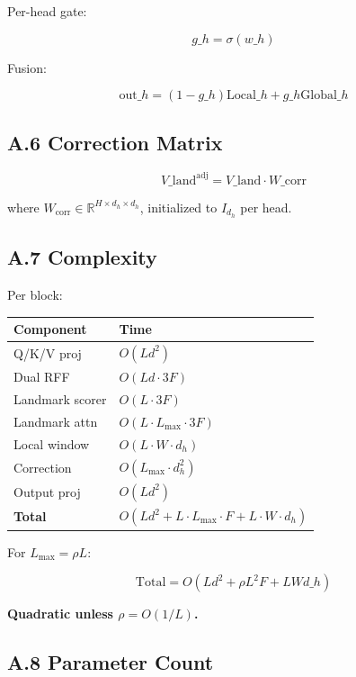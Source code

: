 Per-head gate:

\[
g\_h = \sigma(w\_h)
\tag{A.11}
\]

Fusion:

\[
\text{out}\_h = (1 - g\_h) \text{Local}\_h + g\_h \text{Global}\_h
\tag{A.12}
\]

\subsection{A.6 Correction Matrix}

\[
V\_\text{land}^\text{adj} = V\_\text{land} \cdot W\_\text{corr}
\tag{A.13}
\]

where $W_\text{corr} \in \mathbb{R}^{H \times d_h \times d_h}$, initialized 
to $I_{d_h}$ per head.

\subsection{A.7 Complexity}

Per block:

\begin{table}[H]
\centering
\small
\begin{tabular}{ll}
\toprule
\textbf{Component} & \textbf{Time} \\
\midrule
Q/K/V proj & $O(L d^2)$ \\
Dual RFF & $O(L d \cdot 3F)$ \\
Landmark scorer & $O(L \cdot 3F)$ \\
Landmark attn & $O(L \cdot L_\text{max} \cdot 3F)$ \\
Local window & $O(L \cdot W \cdot d_h)$ \\
Correction & $O(L_\text{max} \cdot d_h^2)$ \\
Output proj & $O(L d^2)$ \\
\textbf{Total} & $O(L d^2 + L \cdot L_\text{max} \cdot F + L \cdot W \cdot d_h)$ \\
\bottomrule
\end{tabular}
\end{table}

For $L_\text{max} = \rho L$:

\[
\text{Total} = O(L d^2 + \rho L^2 F + L W d\_h)
\]

\textbf{Quadratic unless $\rho = O(1/L)$.}

\subsection{A.8 Parameter Count}

